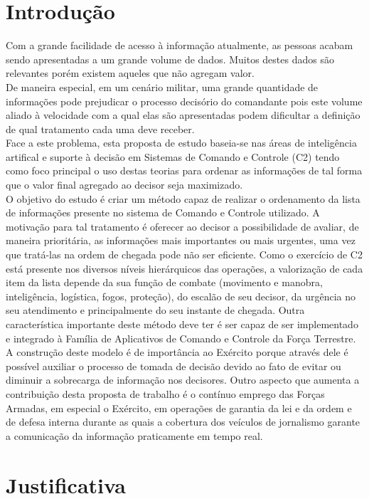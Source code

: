 \documentclass[a4paper,12pt]{article}
\begin{document}
\section{Introdução}
Com a grande facilidade de acesso à informação atualmente, as pessoas acabam sendo apresentadas a um grande volume 
de dados. Muitos destes dados são relevantes porém existem aqueles que não agregam valor. \\
\indent De maneira especial, em um cenário militar, uma grande quantidade de informações pode prejudicar o processo decisório do 
comandante pois este volume aliado à velocidade com a qual elas são apresentadas podem dificultar a definição de qual 
tratamento cada uma deve receber.\\
\indent Face a este problema, esta proposta de estudo baseia-se nas áreas de inteligência artifical e suporte à decisão em Sistemas 
de Comando e Controle (C2) tendo como foco principal o uso destas teorias para ordenar as informações de tal forma que o 
valor final agregado ao decisor seja maximizado.\\
\indent O objetivo do estudo é criar um método capaz de realizar o ordenamento da lista de informações presente no sistema de 
Comando e Controle utilizado. A motivação para tal tratamento é oferecer ao decisor a possibilidade de avaliar, de maneira 
prioritária, as informações mais importantes ou mais urgentes, uma vez que tratá-las na ordem de chegada pode não ser 
eficiente. Como o exercício de C2 está presente nos diversos níveis hierárquicos das operações, a valorização de cada item 
da lista depende da sua função de combate (movimento e manobra, inteligência, logística, fogos, proteção), do escalão de 
seu decisor, da urgência no seu atendimento e principalmente do seu instante de chegada. Outra característica importante 
deste método deve ter é ser capaz de ser implementado e integrado à Família de Aplicativos de Comando e Controle da 
Força Terrestre.\\
\indent A construção deste modelo é de importância ao Exército porque através dele é possível auxiliar o processo de tomada de 
decisão devido ao fato de evitar ou diminuir a sobrecarga de informação nos decisores. Outro aspecto que aumenta a 
contribuição desta proposta de trabalho é o contínuo emprego das Forças Armadas, em especial o Exército, em operações 
de garantia da lei e da ordem e de defesa interna durante as quais a cobertura dos veículos de jornalismo garante a 
comunicação da informação praticamente em tempo real.

\section{Justificativa}
\end{document}
